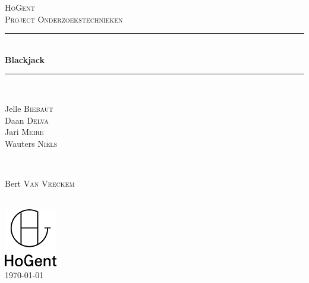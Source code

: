 \documentclass[12pt]{article}
\begin{document}
	
	\begin{titlepage}
		
		\newcommand{\HRule}{\rule{\linewidth}{0.5mm}} 
		
		\textsc{\LARGE HoGent}\\[1.5cm] 
		\textsc{\Large Project Onderzoekstechnieken}\\[0.5cm] 
		
		\HRule \\[0.4cm]
		{ \huge \bfseries Blackjack}\\[0.4cm] 
		\HRule \\[1cm]
		
			
		\begin{minipage}{0.4\textwidth}
			\begin{flushleft} \large
			
				Jelle \textsc{Biebaut}\\
				Daan \textsc{Delva}\\
				Jari \textsc{Meire}\\
				Wauters \textsc{Niels}
			\end{flushleft}
		\end{minipage}
		~
		\begin{minipage}{0.4\textwidth}
			\begin{flushright} \large
			
				Bert \textsc{Van Vreckem} 
			\end{flushright}
		\end{minipage}\\[2cm]
		
		

\includegraphics[width=0.2\linewidth]{HoGent_Logo}\\[2cm]

	

		{\large \today}
		\vfill 
		
	\end{titlepage}
\end{document}
